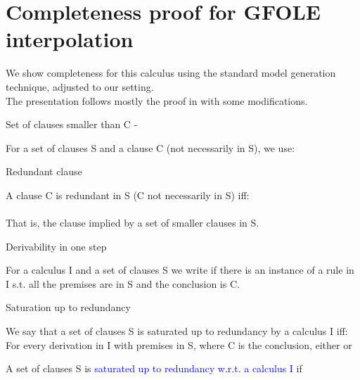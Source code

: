 \newpage
\section{Completeness proof for GFOLE interpolation}\label{appendix:interpolation:completeness}
We show completeness for this calculus using the standard model generation technique, adjusted to our setting.\\
The presentation follows mostly the proof in \cite{BachmairGanzingerSuperposition} with some modifications.


\begin{definition}{Set of clauses smaller than C - \m{\textcolor{blue}{S_C}}}
\label{def_4.3.0.2}

\noindent
For a set of clauses S and a clause C (not necessarily in S), we use:\\
\end{definition}

\begin{definition}{Redundant clause }
\label{def_4.3.0.3}

\noindent
A clause C is redundant in S (C not necessarily in S) iff:\\
\\
That is, the clause implied by a set of smaller clauses in S.
\end{definition}

\begin{definition}{Derivability in one step \m{\textcolor{blue}{S \vdash_I^1 C}}}
\label{def_4.3.0.4}

\noindent
For a calculus I and a set of clauses S we write  if there is an instance of a rule in I s.t. all the premises are in S and the conclusion is C.
\end{definition}

\begin{definition}{Saturation up to redundancy}
\label{def_4.3.0.7}

\noindent
We say that a set of clauses S is saturated up to redundancy by a calculus I iff:\\
For every derivation in I with premises in S, where C is the conclusion, either  or 

\noindent
A set of clauses S is \textcolor{blue}{saturated up to redundancy w.r.t. a calculus I} if \\

\end{definition}

